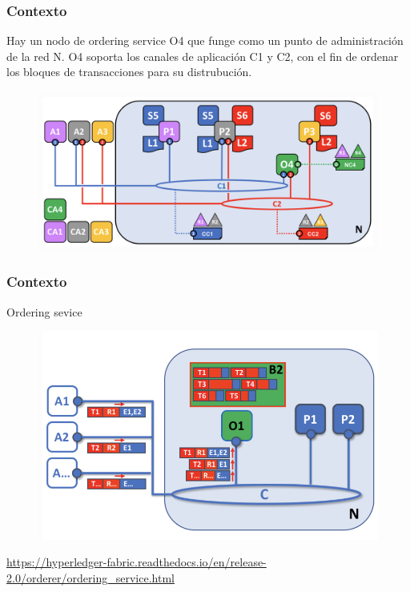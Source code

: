 \documentclass{beamer}
\begin{document}
	\begin{frame}
		\frametitle{Contexto}
		Hay un nodo de ordering service O4 que funge como un punto de administración de la red N. O4 soporta los canales de aplicación C1 y C2, con el fin de ordenar los bloques de transacciones para su distrubución.
		\begin{figure}[h]
			\includegraphics[scale=.3]{start_01}
			\centering
		\end{figure}
	\end{frame}

	\begin{frame}
		\frametitle{Contexto}
		Ordering sevice
		\begin{figure}[h]
			\includegraphics[scale=.5]{start_02}
			\centering
		\end{figure}
		\begin{center}
			\tiny{\url{https://hyperledger-fabric.readthedocs.io/en/release-2.0/orderer/ordering_service.html}}
		\end{center}
	\end{frame}
\end{document}
